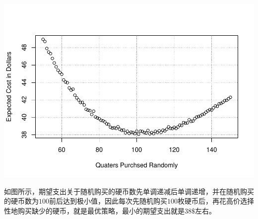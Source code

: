 \documentclass[]{article}
\begin{document}
\includegraphics{Homework_8_files/figure-latex/unnamed-chunk-7-1.pdf}

如图所示，期望支出关于随机购买的硬币数先单调递减后单调递增，并在随机购买的硬币数为\(100\)前后达到极小值，因此每次先随机购买\(100\)枚硬币后，再花高价选择性地购买缺少的硬币，就是最优策略，最小的期望支出就是\(38\$\)左右。
\end{document}
